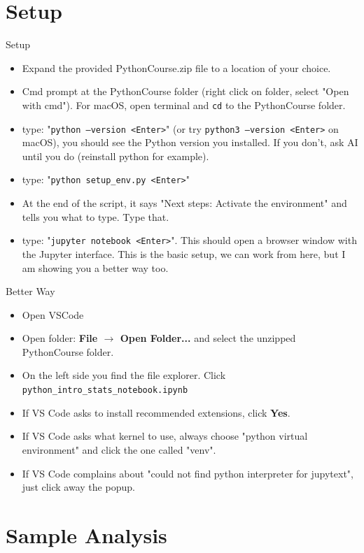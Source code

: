 \documentclass[aspectratio=169]{beamer}
\begin{document}
\section{Setup}
\begin{frame}{Setup}
\begin{itemize}
    \item Expand the provided PythonCourse.zip file to a location of your choice.
    \item Cmd prompt at the PythonCourse folder (right click on folder, select "Open with cmd"). For macOS, open terminal and \texttt{cd} to the PythonCourse folder.
    \item type: "\texttt{python --version <Enter>}" (or try \texttt{python3 --version <Enter>} on macOS), you should see the Python version you installed. If you don't, ask AI until you do (reinstall python for example).
    \item type: "\texttt{python setup\_env.py <Enter>}"
    \item At the end of the script, it says "Next steps: Activate the environment" and tells you what to type. Type that.
    \item type: "\texttt{jupyter notebook <Enter>}". This should open a browser window with the Jupyter interface. This is the basic setup, we can work from here, but I am showing you a better way too. 
\end{itemize}
\end{frame}

\begin{frame}{Better Way}
\begin{itemize}
    \item Open VSCode
    \item Open folder: \textbf{File $\rightarrow$ Open Folder...} and select the unzipped PythonCourse folder.
    \item On the left side you find the file explorer.  Click \texttt{python\_intro\_stats\_notebook.ipynb}
    \item If VS Code asks to install recommended extensions, click \textbf{Yes}.
    \item If VS Code asks what kernel to use, always choose "python virtual environment" and click the one called "venv".
    \item If VS Code complains about "could not find python interpreter for jupytext", just click away the popup.
\end{itemize}
\end{frame}

\section{Sample Analysis}
\end{document}
